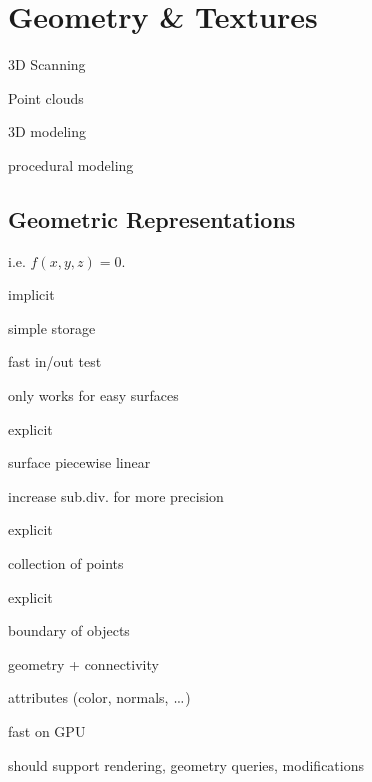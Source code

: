 \section{Geometry \& Textures}
\begin{definition}
  \begin{itemize*}
    \item 3D Scanning
    \item Point clouds
    \item 3D modeling
    \item procedural modeling
  \end{itemize*}
\end{definition}

\subsection{Geometric Representations}

\begin{definition}
  i.e. \(f(x, y , z) = 0\).
  \begin{itemize*}
    \item implicit
    \item simple storage
    \item fast in/out test
    \item only works for easy surfaces
  \end{itemize*}
\end{definition}

\begin{definition}
  \begin{itemize*}
    \item explicit
    \item surface piecewise linear
    \item increase sub.div. for more precision
  \end{itemize*}
\end{definition}

\begin{definition}
  \begin{itemize*}
    \item explicit
    \item collection of points
  \end{itemize*}
\end{definition}

\begin{definition}
  \begin{itemize*}
    \item explicit
    \item boundary of objects
    \item geometry + connectivity
    \item attributes (color, normals, \(\sdots\))
    \item fast on GPU
    \item should support rendering, geometry queries, modifications
  \end{itemize*}
\end{definition}

